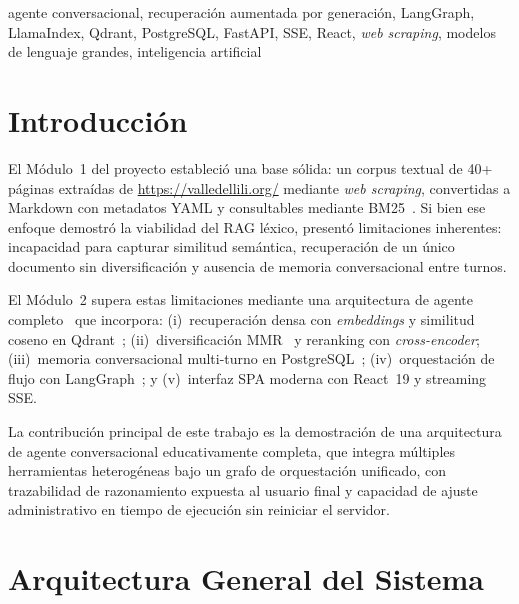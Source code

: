 \documentclass[conference]{IEEEtran}
\begin{document}
\begin{IEEEkeywords}
agente conversacional, recuperación aumentada por generación, LangGraph,
LlamaIndex, Qdrant, PostgreSQL, FastAPI, SSE, React, \textit{web scraping},
modelos de lenguaje grandes, inteligencia artificial
\end{IEEEkeywords}

\section{Introducción}

El Módulo~1 del proyecto estableció una base sólida: un corpus textual de 40+
páginas extraídas de \url{https://valledellili.org/} mediante \textit{web
scraping}, convertidas a Markdown con metadatos YAML y consultables mediante
BM25~\cite{robertson2009bm25}. Si bien ese enfoque demostró la viabilidad del
RAG léxico, presentó limitaciones inherentes: incapacidad para capturar
similitud semántica, recuperación de un único documento sin diversificación y
ausencia de memoria conversacional entre turnos.

El Módulo~2 supera estas limitaciones mediante una arquitectura de agente
completo~\cite{lewis2020rag, chase2022langchain} que incorpora: (i)~recuperación
densa con \textit{embeddings} y similitud coseno en Qdrant~\cite{qdrant2024};
(ii)~diversificación MMR~\cite{carbonell1998mmr} y reranking con
\textit{cross-encoder}; (iii)~memoria conversacional multi-turno en
PostgreSQL~\cite{langchainpostgres}; (iv)~orquestación de flujo con
LangGraph~\cite{langgraph2024}; y (v)~interfaz SPA moderna con React~19
y streaming SSE.

La contribución principal de este trabajo es la demostración de una
arquitectura de agente conversacional educativamente completa, que integra
múltiples herramientas heterogéneas bajo un grafo de orquestación unificado,
con trazabilidad de razonamiento expuesta al usuario final y capacidad de
ajuste administrativo en tiempo de ejecución sin reiniciar el servidor.

\section{Arquitectura General del Sistema}
\label{sec:arq}
\end{document}
